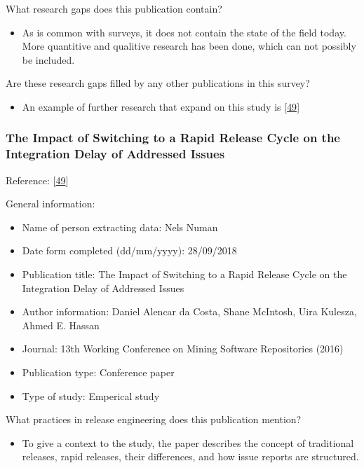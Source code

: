 \documentclass[]{book}
\providecommand{\tightlist}{%
  \setlength{\itemsep}{0pt}\setlength{\parskip}{0pt}}
\begin{document}
What research gaps does this publication contain?

\begin{itemize}
\tightlist
\item
  As is common with surveys, it does not contain the state of the field
  today. More quantitive and qualitive research has been done, which can
  not possibly be included.
\end{itemize}

Are these research gaps filled by any other publications in this survey?

\begin{itemize}
\tightlist
\item
  An example of further research that expand on this study is
  {[}\protect\hyperlink{ref-da2016a}{49}{]}
\end{itemize}

\subsubsection{The Impact of Switching to a Rapid Release Cycle on the
Integration Delay of Addressed
Issues}\label{the-impact-of-switching-to-a-rapid-release-cycle-on-the-integration-delay-of-addressed-issues}

Reference: {[}\protect\hyperlink{ref-da2016a}{49}{]}

General information:

\begin{itemize}
\tightlist
\item
  Name of person extracting data: Nels Numan
\item
  Date form completed (dd/mm/yyyy): 28/09/2018
\item
  Publication title: The Impact of Switching to a Rapid Release Cycle on
  the Integration Delay of Addressed Issues
\item
  Author information: Daniel Alencar da Costa, Shane McIntosh, Uira
  Kulesza, Ahmed E. Hassan
\item
  Journal: 13th Working Conference on Mining Software Repositories
  (2016)
\item
  Publication type: Conference paper
\item
  Type of study: Emperical study
\end{itemize}

What practices in release engineering does this publication mention?

\begin{itemize}
\tightlist
\item
  To give a context to the study, the paper describes the concept of
  traditional releases, rapid releases, their differences, and how issue
  reports are structured.
\end{itemize}
\end{document}
